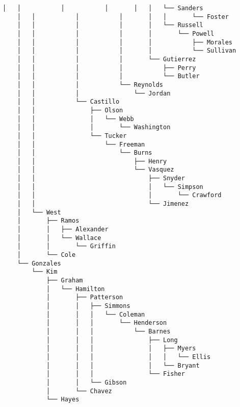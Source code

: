 \documentclass[11pt]{article}
\begin{document}
\begin{Verbatim}[commandchars=\\\{\}]
    │   │           │           │       │   │   └── Sanders
    │   │           │           │       │   │       └── Foster
    │   │           │           │       │   └── Russell
    │   │           │           │       │       └── Powell
    │   │           │           │       │           ├── Morales
    │   │           │           │       │           └── Sullivan
    │   │           │           │       └── Gutierrez
    │   │           │           │           ├── Perry
    │   │           │           │           └── Butler
    │   │           │           └── Reynolds
    │   │           │               └── Jordan
    │   │           └── Castillo
    │   │               ├── Olson
    │   │               │   └── Webb
    │   │               │       └── Washington
    │   │               └── Tucker
    │   │                   └── Freeman
    │   │                       └── Burns
    │   │                           ├── Henry
    │   │                           └── Vasquez
    │   │                               ├── Snyder
    │   │                               │   └── Simpson
    │   │                               │       └── Crawford
    │   │                               └── Jimenez
    │   └── West
    │       ├── Ramos
    │       │   ├── Alexander
    │       │   └── Wallace
    │       │       └── Griffin
    │       └── Cole
    └── Gonzales
        └── Kim
            ├── Graham
            │   └── Hamilton
            │       ├── Patterson
            │       │   ├── Simmons
            │       │   │   └── Coleman
            │       │   │       └── Henderson
            │       │   │           └── Barnes
            │       │   │               ├── Long
            │       │   │               │   ├── Myers
            │       │   │               │   │   └── Ellis
            │       │   │               │   └── Bryant
            │       │   │               └── Fisher
            │       │   └── Gibson
            │       └── Chavez
            └── Hayes
    \end{Verbatim}


    
    
    
\end{document}
